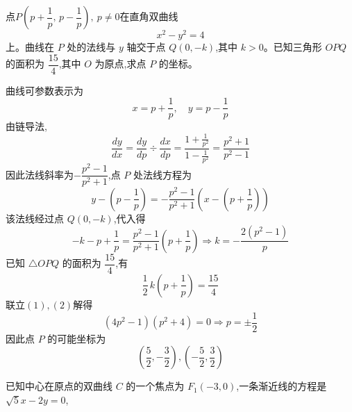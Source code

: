 \begin{questions}
    \question 点$P\left(p+\dfrac{1}{p},\,p-\dfrac{1}{p}\right),\ p\neq 0$在直角双曲线
    \[
    x^2-y^2=4
    \]
    上。曲线在 $P$ 处的法线与 $y$ 轴交于点 $Q(0,-k)$,其中 $k>0$。已知三角形 $OPQ$ 的面积为 $\dfrac{15}{4}$,其中 $O$ 为原点,求点 $P$ 的坐标。
    \begin{solution}
        曲线可参数表示为
        \[
        x=p+\frac{1}{p},\quad y=p-\frac{1}{p}
        \]
        由链导法,
        \[
        \frac{dy}{dx}=\frac{dy}{dp} \div \frac{dx}{dp}
        =\frac{1+\frac{1}{p^2}}{1-\frac{1}{p^2}}
        =\frac{p^2+1}{p^2-1}
        \]
        因此法线斜率为$-\dfrac{p^2-1}{p^2+1}$,点 $P$ 处法线方程为
        \[
        y-\left(p-\frac{1}{p}\right)
        =-\frac{p^2-1}{p^2+1}\left(x-\left(p+\frac{1}{p}\right)\right)
        \]
        该法线经过点 $Q(0,-k)$,代入得
        \[
        -k-p+\frac{1}{p}=\frac{p^2-1}{p^2+1}\left(p+\frac{1}{p}\right) \Rightarrow k=-\frac{2(p^2-1)}{p} \tag{1}
        \]
        已知 $\triangle OPQ$ 的面积为 $\dfrac{15}{4}$,有
        \[
        \frac{1}{2}\,k\left(p+\frac{1}{p}\right)=\frac{15}{4} \tag{2}
        \]
        联立$(1),(2)$解得
        \[
        (4p^2-1)(p^2+4)=0 \Rightarrow p=\pm\frac{1}{2}
        \]
        因此点 $P$ 的可能坐标为
        \[
        \left(\frac{5}{2},-\frac{3}{2}\right),        \left(-\frac{5}{2},\frac{3}{2}\right)
        \]
    \end{solution}

    \question 已知中心在原点的双曲线 $C$ 的一个焦点为 $F_{1}(-3,0)$,一条渐近线的方程是$\sqrt{5}x-2y=0$,
\end{questions}
